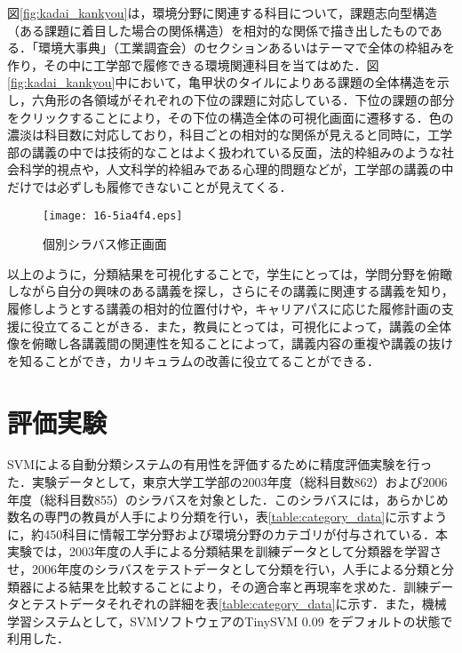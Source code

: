 \documentclass[japanese]{jnlp_1.4}
\begin{document}
図\ref{fig:kadai_kankyou}は，環境分野に関連する科目について，課題志向型構造（ある課題に着目した場合の関係構造）を相対的な関係で描き出したものである．「環境大事典」（工業調査会）のセクションあるいはテーマで全体の枠組みを作り，その中に工学部で履修できる環境関連科目を当てはめた．図\ref{fig:kadai_kankyou}中において，亀甲状のタイルによりある課題の全体構造を示し，六角形の各領域がそれぞれの下位の課題に対応している．下位の課題の部分をクリックすることにより，その下位の構造全体の可視化画面に遷移する．色の濃淡は科目数に対応しており，科目ごとの相対的な関係が見えると同時に，工学部の講義の中では技術的なことはよく扱われている反面，法的枠組みのような社会科学的視点や，人文科学的枠組みである心理的問題などが，工学部の講義の中だけでは必ずしも履修できないことが見えてくる．

\begin{figure}[t]
\begin{center}
\texttt{[image: 16-5ia4f4.eps]}
\end{center}
\caption{個別シラバス修正画面}
\label{fig:syllabus_detail}
\end{figure}

以上のように，分類結果を可視化することで，学生にとっては，学問分野を俯瞰しながら自分の興味のある講義を探し，さらにその講義に関連する講義を知り，履修しようとする講義の相対的位置付けや，キャリアパスに応じた履修計画の支援に役立てることがきる．また，教員にとっては，可視化によって，講義の全体像を俯瞰し各講義間の関連性を知ることによって，講義内容の重複や講義の抜けを知ることができ，カリキュラムの改善に役立てることができる．



\section{評価実験}

SVMによる自動分類システムの有用性を評価するために精度評価実験を行った．実験データとして，東京大学工学部の2003年度（総科目数862）および2006年度（総科目数855）のシラバスを対象とした．このシラバスには，あらかじめ数名の専門の教員が人手により分類を行い，表\ref{table:category_data}に示すように，約450科目に情報工学分野および環境分野のカテゴリが付与されている．本実験では，2003年度の人手による分類結果を訓練データとして分類器を学習させ，2006年度のシラバスをテストデータとして分類を行い，人手による分類と分類器による結果を比較することにより，その適合率と再現率を求めた．訓練データとテストデータそれぞれの詳細を表\ref{table:category_data}に示す．また，機械学習システムとして，SVMソフトウェアのTinySVM 0.09 をデフォルトの状態で利用した．
\end{document}
